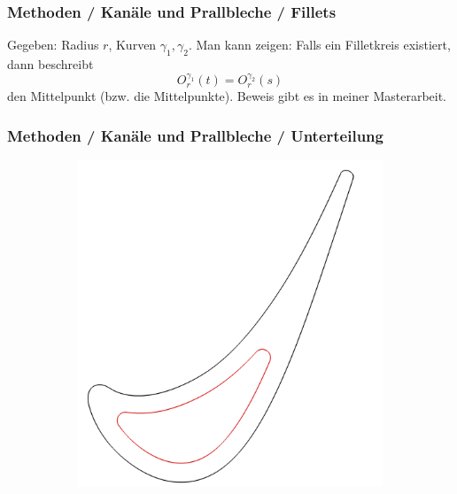 \documentclass[8pt, aspectratio=169]{beamer}
\begin{document}
\begin{frame}
	\frametitle{Methoden / Kanäle und Prallbleche / Fillets}
	\vspace{-0.5cm}\hspace{-0.5cm}
	\begin{minipage}[t]{\textwidth}
		Gegeben: Radius $r$, Kurven $\gamma_1, \gamma_2$. Man kann zeigen: Falls ein Filletkreis existiert, dann beschreibt
			$$ O^{\gamma_1}_r(t) = O^{\gamma_2}_r(s)$$
		den Mittelpunkt (bzw. die Mittelpunkte). Beweis gibt es in meiner Masterarbeit.
		\begin{figure}[H]
			\centering
			
			\label{fig:filletconstruction}
		\end{figure}
		\begin{figure}[H]
			\centering
			
		\end{figure}
	\end{minipage}
\end{frame}

\begin{frame}
	\frametitle{Methoden / Kanäle und Prallbleche / Unterteilung}
	\vspace{-1cm}\hspace{0.5cm}
	\begin{figure}
		\centering
		\begin{subfigure}[t]{.49\textwidth}
			\phantom{11}
			\includegraphics[height=.79\textheight]{../tec/shrinking/13.png}
		\end{subfigure}
	\end{figure}
\end{frame}
\end{document}
